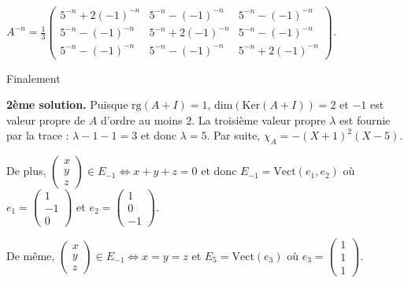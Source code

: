 {{\begin{center}
$
A^{-n}=\frac{1}{3}\left(\begin{array}{ccc}
5^{-n}+2(-1)^{-n}&5^{-n}-(-1)^{-n}&5^{-n}-(-1)^{-n}\\
5^{-n}-(-1)^{-n}&5^{-n}+2(-1)^{-n}&5^{-n}-(-1)^{-n}\\
5^{-n}-(-1)^{-n}&5^{-n}-(-1)^{-n}&5^{-n}+2(-1)^{-n}
\end{array}
\right)$.
\end{center}

Finalement

\begin{center}
\end{center}

\textbf{2ème solution.} Puisque $\text{rg}(A+I)=1$, $\text{dim}(\text{Ker}(A+I))=2$ et $-1$ est valeur propre de $A$ d'ordre au moins $2$. La troisième valeur propre $\lambda$ est fournie par la trace : $\lambda-1-1=3$ et donc $\lambda=5$. Par suite, $\chi_A=-(X+1)^2(X-5)$.

De plus, $\left(\begin{array}{c}
x\\
y\\
z
\end{array}
\right)\in E_{-1}\Leftrightarrow x+y+z=0$ et donc $E_{-1}=\text{Vect}(e_1,e_2)$ où $e_1=\left(\begin{array}{c}
1\\
-1\\
0
\end{array}
\right)$ et $e_2=\left(\begin{array}{c}
1\\
0\\
-1
\end{array}
\right)$.

De même,  $\left(\begin{array}{c}
x\\
y\\
z
\end{array}
\right)\in E_{-1}\Leftrightarrow x=y=z$ et $E_5=\text{Vect}(e_3)$ où $e_3=\left(\begin{array}{c}
1\\
1\\
1
\end{array}
\right)$.

}}
